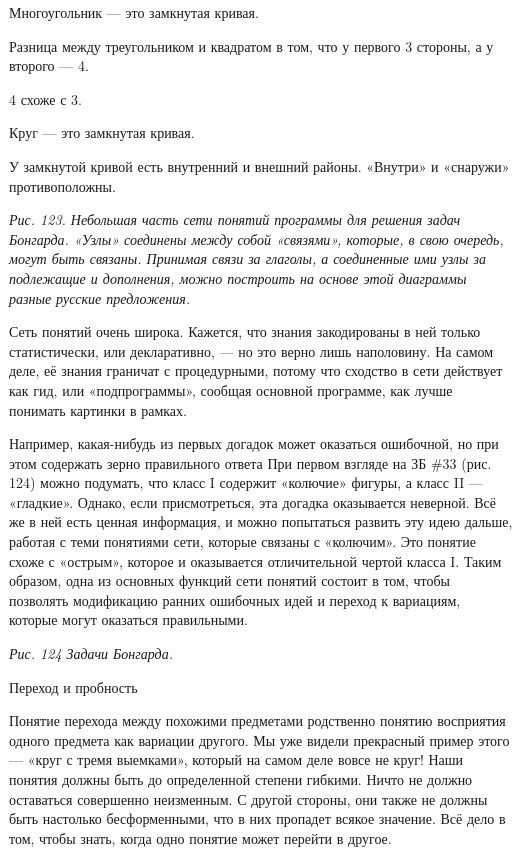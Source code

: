 \documentclass[../main.tex]{subfiles}
\begin{document}
Многоугольник --- это замкнутая кривая.

Разница между треугольником и квадратом в том, что у первого 3 стороны, а у второго --- 4.

4 схоже с 3.

Круг --- это замкнутая кривая.

У замкнутой кривой есть внутренний и внешний районы. «Внутри» и «снаружи» противоположны.

\emph{Рис. 123. Небольшая часть сети понятий программы для решения задач Бонгарда. «Узлы» соединены между собой «связями», которые, в свою очередь, могут быть связаны. Принимая связи за глаголы, а соединенные ими узлы за подлежащие и дополнения, можно построить на основе этой диаграммы разные русские предложения.}

Сеть понятий очень широка. Кажется, что знания закодированы в ней только статистически, или декларативно, --- но это верно лишь наполовину. На самом деле, её знания граничат с процедурными, потому что сходство в сети действует как гид, или «подпрограммы», сообщая основной программе, как лучше понимать картинки в рамках.

Например, какая-нибудь из первых догадок может оказаться ошибочной, но при этом содержать зерно правильного ответа При первом взгляде на ЗБ \#33 (рис. 124) можно подумать, что класс I содержит «колючие» фигуры, а класс II --- «гладкие». Однако, если присмотреться, эта догадка оказывается неверной. Всё же в ней есть ценная информация, и можно попытаться развить эту идею дальше, работая с теми понятиями сети, которые связаны с «колючим». Это понятие схоже с «острым», которое и оказывается отличительной чертой класса I. Таким образом, одна из основных функций сети понятий состоит в том, чтобы позволять модификацию ранних ошибочных идей и переход к вариациям, которые могут оказаться правильными.

\emph{Рис. 124 Задачи Бонгарда.}

Переход и пробность

Понятие перехода между похожими предметами родственно понятию восприятия одного предмета как вариации другого. Мы уже видели прекрасный пример этого --- «круг с тремя выемками», который на самом деле вовсе не круг! Наши понятия должны быть до определенной степени гибкими. Ничто не должно оставаться совершенно неизменным. С другой стороны, они также не должны быть настолько бесформенными, что в них пропадет всякое значение. Всё дело в том, чтобы знать, когда одно понятие может перейти в другое.
\end{document}
